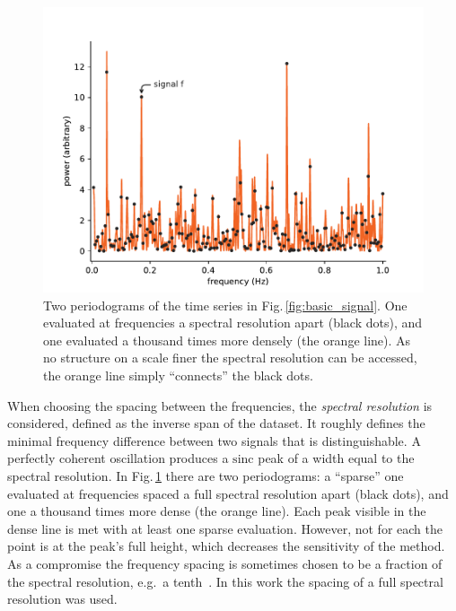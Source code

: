 \begin{figure}
  \centering \includegraphics[width=\linewidth]{gfx/axions/basic_periodogram.pdf}
  \caption{Two periodograms of the time series in Fig.\,\ref{fig:basic_signal}. One evaluated at frequencies a spectral resolution apart (black dots), and one evaluated a thousand times more densely (the orange line). As no structure on a scale finer the spectral resolution can be accessed, the orange line simply ``connects'' the black dots.}\label{fig:basic_periodogram}
\end{figure}

When choosing the spacing between the frequencies, the \emph{spectral resolution} is considered, defined as the inverse span of the dataset.
It roughly defines the minimal frequency difference between two signals that is distinguishable. A perfectly coherent oscillation produces a $\mathrm{sinc}$ peak of a width equal to the spectral resolution. 
In Fig.\,\ref{fig:basic_periodogram} there are two periodograms: a ``sparse'' one evaluated at frequencies spaced a full spectral resolution apart (black dots), and one a thousand times more dense (the orange line).
Each peak visible in the dense line is met with at least one sparse evaluation. However, not for each the point is at the peak's full height, which decreases the sensitivity of the method. As a compromise the frequency spacing is sometimes chosen to be a fraction of the spectral resolution, e.g.\ a tenth~\cite{Debosscher2007}. In this work the spacing of a full spectral resolution was used.

